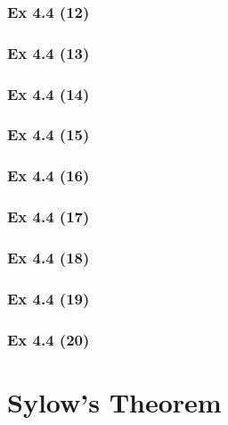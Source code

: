 \subsubsection{Ex 4.4 (12)}\label{sec:Ex_4.4.12}

\subsubsection{Ex 4.4 (13)}\label{sec:Ex_4.4.13}

\subsubsection{Ex 4.4 (14)}\label{sec:Ex_4.4.14}

\subsubsection{Ex 4.4 (15)}\label{sec:Ex_4.4.15}

\subsubsection{Ex 4.4 (16)}\label{sec:Ex_4.4.16}

\subsubsection{Ex 4.4 (17)}\label{sec:Ex_4.4.17}

\subsubsection{Ex 4.4 (18)}\label{sec:Ex_4.4.18}

\subsubsection{Ex 4.4 (19)}\label{sec:Ex_4.4.19}

\subsubsection{Ex 4.4 (20)}\label{sec:Ex_4.4.20}

\newpage		%

\section{Sylow's Theorem}\label{sec:4.5}	
